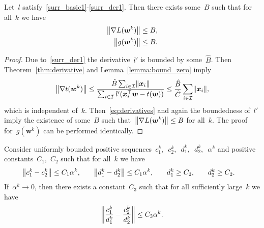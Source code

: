 \begin{lemma}\label{lemma:bound_g}
  Let~$l$ satisfy~\ref{surr_basic1}-\ref{surr_der1}. Then there exists some~$B$ such that for all~$k$ we have
  \begin{equation*}
    \begin{aligned}
      \norm{\nabla L(\bm{w}^k)} & \leq B, \\
      \norm{g(\bm{w}^k)} & \leq B.
    \end{aligned}
  \end{equation*}
\end{lemma}
\begin{proof}
  Due to~\ref{surr_der1} the derivative~$l'$ is bounded by some~$\hat{B}$. Then Theorem~\ref{thm:derivative} and Lemma~\ref{lemma:bound_zero} imply
  \begin{equation*}
    \norm{\nabla t(\bm{w}^k)}
      \leq \frac{\hat{B} \sum_{i \in \I} \norm{\bm{x}_i}}{\sum_{i \in \I} l'(\bm{x}_i^\top \bm{w} - t(\bm{w}))}
      \leq \frac{\hat{B}}{\hat{C}} \sum_{i\in \I} \norm{\bm{x}_i},
  \end{equation*}
  which is independent of~$k$. Then~\eqref{eq:derivatives} and again the boundedness of~$l'$ imply the existence of some~$B$ such that~$\norm{\nabla L(\bm{w}^k)} \leq B$ for all~$k$. The proof for~$g(\bm{w}^k)$ can be performed identically.
\end{proof}

\begin{lemma}\label{lemma:ratio}
  Consider uniformly bounded positive sequences~$c_1^k,$~$c_2^k,$~$d_1^k,$~$d_2^k,$~$\alpha^k$ and positive constants~$C_1$,~$C_2$ such that for all~$k$ we have
  \begin{equation*}
    \begin{aligned}
      \norm{c_1^k-c_2^k} & \leq C_1\alpha^k, \quad &
      \norm{d_1^k-d_2^k} & \leq C_1\alpha^k, \quad &
      d_1^k & \geq C_2, \quad &
      d_2^k & \geq C_2.
    \end{aligned}
  \end{equation*}
  If~$\alpha^k \to 0$, then there exists a constant~$C_3$ such that for all sufficiently large~$k$ we have
  \begin{equation*}
    \norm{\frac{c_1^k}{d_1^k} - \frac{c_2^k}{d_2^k}} \leq C_3\alpha^k.
  \end{equation*}
\end{lemma}

